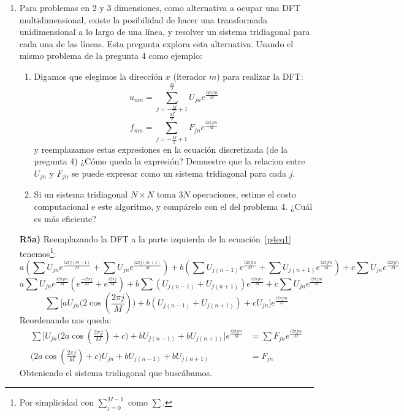 \documentclass{article}
\begin{document}
\begin{enumerate}
    \item Para problemas en 2 y 3 dimensiones, como alternativa a ocupar una DFT multidimensional, existe la posibilidad de hacer una transformada unidimensional a lo largo de una línea, y resolver un sistema tridiagonal para cada una de las líneas. Esta pregunta explora esta alternativa. Usando el mismo problema de la pregunta 4 como ejemplo:
    \begin{enumerate}
        \item Digamos que elegimos la dirección $x$ (iterador $m$) para realizar la DFT:
        \begin{equation}\label{p5eq1}
            u_{mn} = \sum_{j=-\frac{M}{2}+1}^{\frac{M}{2}} U_{jn}e^{\frac{i2\pi jm}{M}}
        \end{equation}
        \begin{equation}\label{p5eq2}
            f_{mn} = \sum_{j=-\frac{M}{2}+1}^{\frac{M}{2}} F_{jn}e^{\frac{i2\pi jm}{M}}
        \end{equation}
        y reemplazamos estas expresiones en la ecuación discretizada (de la pregunta 4) ¿Cómo queda la expresión? Demuestre que la relacion entre $U_{jn}$ y $F_{jn}$ se puede expresar como un sistema tridiagonal para cada $j$.
        \item Si un sistema tridiagonal $N\times N$ toma $3N$ operaciones, estime el costo computacional e este algoritmo, y compárelo con el del problema 4. ¿Cuál es más eficiente?
    \end{enumerate}    
    
    \textbf{R5a)} Reemplazando la DFT a la parte izquierda de la ecuación~\ref{p4eq1} tenemos\footnote{Por simplicidad con $\sum_{j=0}^{M-1}$ como $\sum$.}:
    $$
        a ( \sum U_{jn} e^{\frac{i2\pi j(m-1)}{M}} + 
            \sum U_{jn} e^{\frac{i2\pi j(m+1)}{M}}) + 
        b ( \sum U_{j(n-1)} e^{\frac{i2\pi jm}{M}} +
            \sum U_{j(n+1)} e^{\frac{i2\pi jm}{M}}) + 
        c \sum U_{jn} e^{\frac{i2\pi jm}{M}} 
    $$ $$
        a \sum U_{jn} e^{\frac{i2\pi jm}{M}} 
            (e^{\frac{-i2\pi j}{M}} + e^{\frac{i2\pi j}{M}}) + 
        b \sum (U_{j(n-1)}  + U_{j(n+1)}) e^{\frac{i2\pi jm}{M}} + 
        c \sum U_{jn} e^{\frac{i2\pi jm}{M}} 
    $$ $$
        \sum \Big[
        a U_{jn} \big(2\cos(\frac{2\pi j}{M})\big) + 
        b (U_{j(n-1)}  + U_{j(n+1)}) + cU_{jn} \Big] e^{\frac{i2\pi jm}{M}}
    $$
    Reordenando nos queda:
    \begin{align*}
        \sum \Big[U_{jn} \big(2a\cos(\frac{2\pi j}{M}) + c \big) + 
        bU_{j(n-1)}  + bU_{j(n+1)} \Big] e^{\frac{i2\pi jm}{M}} &= 
        \sum F_{jn} e^{\frac{i2\pi jm}{M}} \\
        \big(2a\cos(\frac{2\pi j}{M}) + c \big) U_{jn} + bU_{j(n-1)}  + bU_{j(n+1)}
        &= F_{jn}
    \end{align*}
    Obteniendo el sistema tridiagonal que buscábamos.
 

\end{enumerate}
\end{document}
